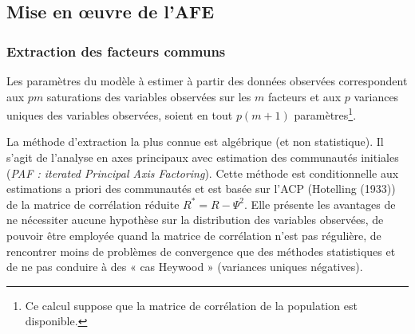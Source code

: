 \documentclass[12pt,a4paper]{reedthesis}
\begin{document}
\hypertarget{mise-en-ux153uvre-de-lafe}{%
\subsection{Mise en œuvre de l'AFE}\label{mise-en-ux153uvre-de-lafe}}

\hypertarget{extraction-des-facteurs-communs}{%
\subsubsection{Extraction des facteurs communs}\label{extraction-des-facteurs-communs}}

Les paramètres du modèle à estimer à partir des données observées correspondent aux \(pm\) saturations des variables observées sur les \(m\) facteurs et aux \(p\) variances uniques des variables observées, soient en tout \(p(m+1)\) paramètres\footnote{Ce calcul suppose que la matrice de corrélation de la population est disponible.}.

La méthode d'extraction la plus connue est algébrique (et non statistique). Il s'agit de l'analyse en axes principaux avec estimation des communautés initiales (\emph{PAF : iterated Principal Axis Factoring}). Cette méthode est conditionnelle aux estimations a priori des communautés et est basée sur l'ACP (Hotelling (1933)) de la matrice de corrélation réduite \(R^* = R - \Psi^2\). Elle présente les avantages de ne nécessiter aucune hypothèse sur la distribution des variables observées, de pouvoir être employée quand la matrice de corrélation n'est pas régulière, de rencontrer moins de problèmes de convergence que des méthodes statistiques et de ne pas conduire à des « cas Heywood » (variances uniques négatives).
\end{document}
